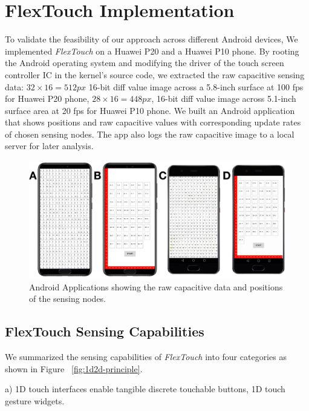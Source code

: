 \chapter{FlexTouch Implementation}

To validate the feasibility of our approach across different Android devices, We implemented \textit{FlexTouch} on a Huawei P20 and a Huawei P10 phone. By rooting the Android operating system and modifying the driver of the touch screen controller IC in the kernel's source code, we extracted the raw capacitive sensing data: $32 \times 16 = 512 px$ 16-bit diff value image across a 5.8-inch surface at 100 fps for Huawei P20 phone, $28 \times 16 = 448 px$, 16-bit diff value image across 5.1-inch surface area at 20 fps for Huawei P10 phone. We built an Android application that shows positions and raw capacitive values with corresponding update rates of chosen sensing nodes. The app also logs the raw capacitive image to a local server for later analysis.

\begin{figure}[ht]
    \centering
      \includegraphics[width=0.95\columnwidth]{figures/rawdata.png}
      \setlength{\belowcaptionskip}{-6pt}
      \caption{Android Applications showing the raw capacitive data and positions of the sensing nodes.}
      \label{fig:Android Applications showing the raw capacitive data and positions of the sensing nodes.}
\end{figure}

\section{FlexTouch Sensing Capabilities}
We summarized the sensing capabilities of \textit{FlexTouch} into four categories as shown in Figure ~\ref{fig:1d2d-principle}. 

a) 1D touch interfaces enable tangible discrete touchable buttons, 1D touch gesture widgets.

